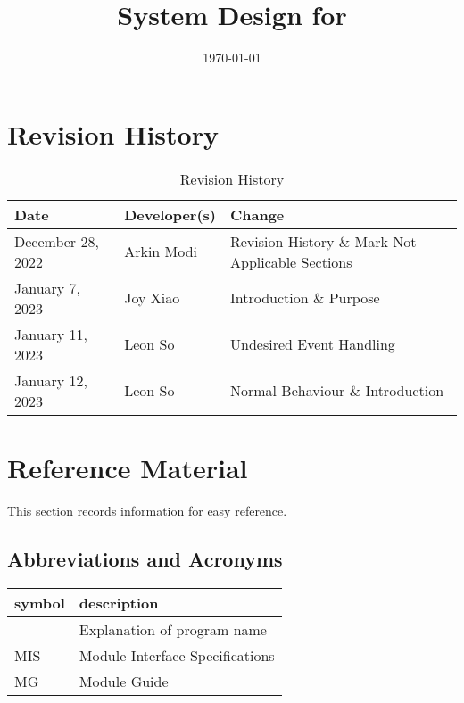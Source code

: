 \documentclass[12pt, titlepage]{article}
\begin{document}
\title{System Design for \progname{}}
\author{\authname}
\date{\today}

\maketitle


\section{Revision History}

\begin{table}[hp]
	\caption{Revision History} \label{TblRevisionHistory}
	\begin{tabularx}{\textwidth}{llX}
		\toprule
		\textbf{Date}     & \textbf{Developer(s)} & \textbf{Change}                                  \\
		\midrule
		December 28, 2022 & Arkin Modi            & Revision History \& Mark Not Applicable Sections \\
		January 7, 2023   & Joy Xiao              & Introduction \& Purpose                          \\
		January 11, 2023  & Leon So               & Undesired Event Handling                         \\
		January 12, 2023  & Leon So               & Normal Behaviour \& Introduction                 \\
		\bottomrule
	\end{tabularx}
\end{table}

\newpage

\section{Reference Material}

This section records information for easy reference.

\subsection{Abbreviations and Acronyms}

\begin{tabular}{l l}
	\toprule
	\textbf{symbol} & \textbf{description}            \\
	\midrule
	\progname       & Explanation of program name     \\
	MIS             & Module Interface Specifications \\
	MG              & Module Guide                    \\
	\bottomrule
\end{tabular}
\end{document}
